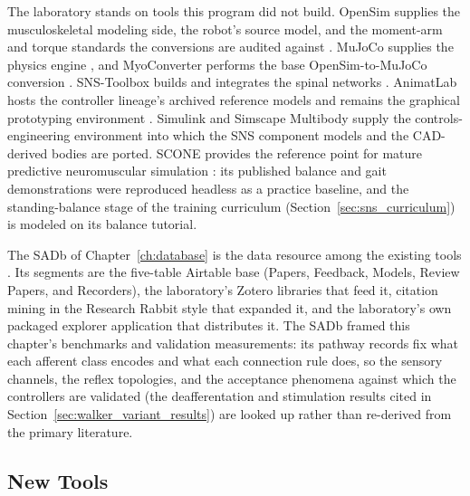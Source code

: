 The laboratory stands on tools this program did not build. OpenSim supplies the musculoskeletal modeling side, the robot's source model, and the moment-arm and torque standards the conversions are audited against \citep{delp_opensim_2007, seth_opensim_2018}. MuJoCo supplies the physics engine \citep{todorov_mujoco_2012}, and MyoConverter performs the base OpenSim-to-MuJoCo conversion \citep{caggiano_myosuite_2022, wang_myosim_2022}. SNS-Toolbox builds and integrates the spinal networks \citep{nourse_sns_2023}. AnimatLab hosts the controller lineage's archived reference models and remains the graphical prototyping environment \citep{cofer_animatlab_2010}. Simulink and Simscape Multibody supply the controls-engineering environment into which the SNS component models and the CAD-derived bodies are ported. SCONE provides the reference point for mature predictive neuromuscular simulation \citep{geijtenbeek_scone_2019}: its published balance and gait demonstrations were reproduced headless as a practice baseline, and the standing-balance stage of the training curriculum (Section~\ref{sec:sns_curriculum}) is modeled on its balance tutorial.

The SADb of Chapter~\ref{ch:database} is the data resource among the existing tools \citep{bolen_sensory_2023}. Its segments are the five-table Airtable base (Papers, Feedback, Models, Review Papers, and Recorders), the laboratory's Zotero libraries that feed it, citation mining in the Research Rabbit style that expanded it, and the laboratory's own packaged explorer application that distributes it. The SADb framed this chapter's benchmarks and validation measurements: its pathway records fix what each afferent class encodes and what each connection rule does, so the sensory channels, the reflex topologies, and the acceptance phenomena against which the controllers are validated (the deafferentation and stimulation results cited in Section~\ref{sec:walker_variant_results}) are looked up rather than re-derived from the primary literature.

\subsection{New Tools}\label{sec:sns_new_tools}


